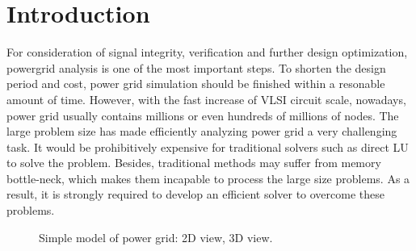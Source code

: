 \documentclass{sig-alternate}
\begin{document}
\section{Introduction}
	For consideration of signal integrity, verification and further design optimization, powergrid analysis is one of the most 
	important steps. To shorten the design period and cost, power grid simulation should be finished within a resonable amount
	of time. 
	However, with the fast increase of VLSI circuit scale, nowadays, power grid usually contains millions or even hundreds 
	of millions of nodes. The large problem size has made efficiently analyzing power grid a very challenging task. 
	It would be prohibitively expensive for traditional solvers such as direct LU to solve the problem. Besides, traditional 
	methods may suffer from memory bottle-neck, which makes them incapable to process the large size problems. As a result, 
	it is strongly required to develop an efficient solver to overcome these problems.
	\begin{figure}[htbp]
	  \caption{Simple model of power grid: 
	   2D view,
	   3D view.}
	  \label{pg_model}
	\end{figure}
\end{document}
